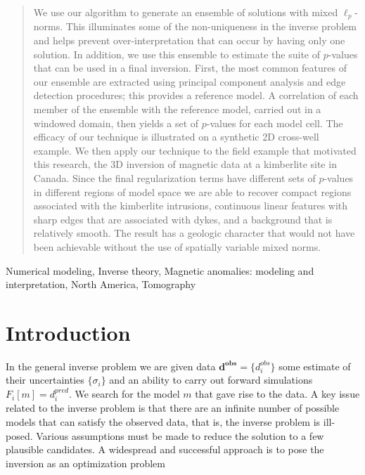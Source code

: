 \documentclass[extra,referee]{gji}
\begin{document}
\begin{abstract}
We use our algorithm to generate an ensemble of solutions with mixed $\ell_p$-norms. This illuminates some of the non-uniqueness in the inverse problem and helps prevent over-interpretation that can occur by having only one solution. In addition, we use this ensemble to estimate the suite of ${p}$-values that can be used in a final inversion. First, the most common features of our ensemble are extracted using principal component analysis and edge detection procedures; this provides a reference model. A correlation of each member of the ensemble with the reference model, carried out in a windowed domain, then yields a set of ${p}$-values for each model cell. The efficacy of our technique is illustrated on a synthetic 2D cross-well example. We then apply our technique to the field example that motivated this research, the 3D inversion of magnetic data at a kimberlite site in Canada. Since the final regularization terms have different sets of $p$-values in different regions of model space we are able to recover compact regions associated with the kimberlite intrusions, continuous linear features with sharp edges that are associated with dykes, and a background that is relatively smooth. The result has a geologic character that would not have been achievable without the use of spatially variable mixed norms.

\end{abstract}

\begin{keywords}
Numerical modeling, Inverse theory, Magnetic anomalies: modeling and interpretation, North America, Tomography
\end{keywords}

\section{Introduction}
In the general inverse problem we are given data $\mathbf{d^{obs}} = \{d_i^{obs}\}$ some estimate of their uncertainties $\{\sigma_i\}$ and an ability to carry out forward simulations $F_i[m]=d_i^{pred}$. We search for the model $m$ that gave rise to the data. A key issue related to the inverse problem is that there are an infinite number of possible models that can satisfy the observed data, that is, the inverse problem is ill-posed. Various assumptions must be made to reduce the solution to a few plausible candidates. A widespread and successful approach is to pose the inversion as an optimization problem
\end{document}
